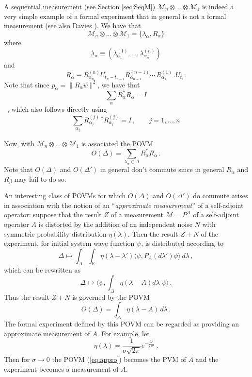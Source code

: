 \documentclass[12pt]{article}
\newcommand{\sa}{self-adjoint}
\newcommand{\wf}{wave function}
\renewcommand{\dagger}{\ast}
\newcommand{\id}{I}
\renewcommand{\a}{\alpha}
\newcommand{\la}{\lambda_{\a}}
\newcommand{\Aa}{R_{\a}}
\newcommand{\Aad}{R^{\dagger}_{\a}}
\newcommand{\R}{\mathbb{R}}
\newcommand{\M}{\mbox{$\mathcal{M}$}}
\newcommand{\norm}{\|}
\begin{document}
A sequential measurement (see Section \ref{sec:SeqM}) $\M_{n}\otimes
\ldots\otimes \M_{1}$ is indeed a very simple example of a formal
experiment that in general is not a formal measurement (see also
Davies \cite{Dav76}). We have that
$$\M_{n}\otimes \ldots\otimes \M_{1}= \{\la, \Aa\}$$
where
$$
\lambda_{\alpha}\equiv(\lambda^{(1)}_{\alpha_{1}},
\ldots,\lambda^{(n)}_{\alpha_{n}})
$$
and
$$
\Aa \equiv R^{(n)}_{\alpha_{n}} U_{t_n -t_{n-1}}
R^{(n-1)}_{\alpha_{n-1}} \cdots\,R^{(1)}_{\alpha_{1}}\,.  U_{t_1 }.
$$
Note that since $p_\a = \norm\Aa\psi\norm^2$, we have that
$$
\sum_{\a} \Aad\Aa =\id$$
\, , which also follows directly using
$$
\sum_{\a_{j}}R^{(j)}_{\alpha_{j}}\,^\dagger R^{(j)}_{\alpha_{j}} =
\id\,,\qquad j= 1,\ldots,n
$$

Now, with $\M_{n}\otimes \ldots\otimes \M_{1}$ is associated the POVM
\begin{displaymath}
O (\Delta) = \sum_{\la \in \Delta} \Aad\Aa \,.
\end{displaymath}
Note that $O(\Delta)$ and $O(\Delta ')$ in general don't commute since
in general $R_{\a}$ and $R_{\beta}$ may fail to do so.  \bigskip

An interesting class of POVMs for which $O(\Delta)$ and $O(\Delta ')$
do commute arises in association with the notion of an
``\emph{approximate measurement}'' of a \sa{} operator: suppose that
the result $Z$ of a measurement $\M=P^A$ of a \sa{} operator $A$ is
distorted by the addition of an independent noise $N$ with symmetric
probability distribution $\eta (\lambda)$.  Then the result $Z+N$ of
the experiment, for initial system \wf{} $\psi$, is distributed
according to $$\Delta \mapsto \int_{\Delta}\int_{\R} \eta(\lambda -
\lambda ') \langle \psi, P_A (d\lambda ')\psi\rangle \, d\lambda \, ,
$$
which can be rewritten as
$$
\Delta \mapsto \langle\psi,\int_{\Delta} \eta(\lambda -A)
d\lambda\; \psi\rangle\, .$$
Thus the result $Z+N$ is governed by the
POVM
   \begin{equation}
O (\Delta)=\int_{\Delta} \eta(\lambda
-A)\, d\lambda \, .
\label{eq:appro}
\end{equation}
The formal experiment defined by this POVM can be regarded as
providing an approximate measurement of $A$. For example, let
\begin{equation}
\eta (\lambda) = \frac{1}{\sigma\sqrt{2\pi}}
e^{-\frac{\lambda^2}{2\,\sigma^2}}\, .
\label{gauss}
\end{equation}
Then for $\sigma\to 0$ the POVM (\ref{eq:appro}) becomes the PVM of
$A$ and the experiment becomes a measurement of $A$.
\end{document}
